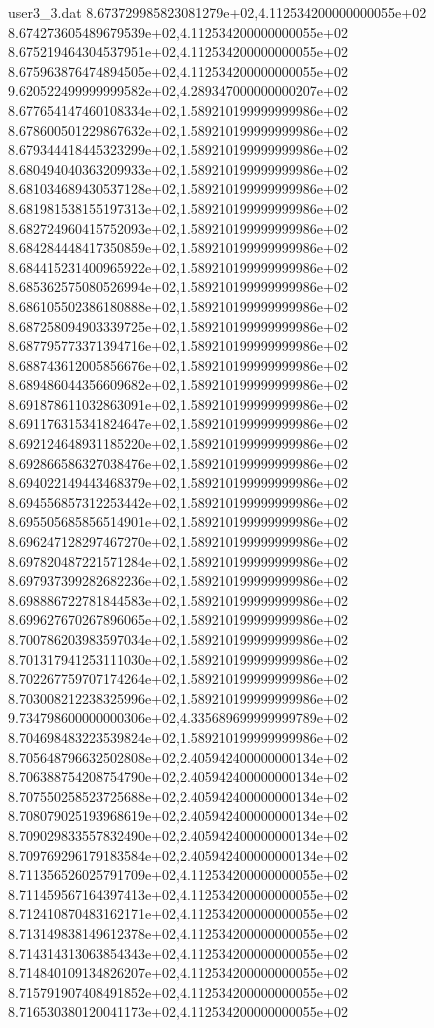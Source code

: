 \begin{filecontents}{user3_3.dat}
8.673729985823081279e+02,4.112534200000000055e+02
8.674273605489679539e+02,4.112534200000000055e+02
8.675219464304537951e+02,4.112534200000000055e+02
8.675963876474894505e+02,4.112534200000000055e+02
9.620522499999999582e+02,4.289347000000000207e+02
8.677654147460108334e+02,1.589210199999999986e+02
8.678600501229867632e+02,1.589210199999999986e+02
8.679344418445323299e+02,1.589210199999999986e+02
8.680494040363209933e+02,1.589210199999999986e+02
8.681034689430537128e+02,1.589210199999999986e+02
8.681981538155197313e+02,1.589210199999999986e+02
8.682724960415752093e+02,1.589210199999999986e+02
8.684284448417350859e+02,1.589210199999999986e+02
8.684415231400965922e+02,1.589210199999999986e+02
8.685362575080526994e+02,1.589210199999999986e+02
8.686105502386180888e+02,1.589210199999999986e+02
8.687258094903339725e+02,1.589210199999999986e+02
8.687795773371394716e+02,1.589210199999999986e+02
8.688743612005856676e+02,1.589210199999999986e+02
8.689486044356609682e+02,1.589210199999999986e+02
8.691878611032863091e+02,1.589210199999999986e+02
8.691176315341824647e+02,1.589210199999999986e+02
8.692124648931185220e+02,1.589210199999999986e+02
8.692866586327038476e+02,1.589210199999999986e+02
8.694022149443468379e+02,1.589210199999999986e+02
8.694556857312253442e+02,1.589210199999999986e+02
8.695505685856514901e+02,1.589210199999999986e+02
8.696247128297467270e+02,1.589210199999999986e+02
8.697820487221571284e+02,1.589210199999999986e+02
8.697937399282682236e+02,1.589210199999999986e+02
8.698886722781844583e+02,1.589210199999999986e+02
8.699627670267896065e+02,1.589210199999999986e+02
8.700786203983597034e+02,1.589210199999999986e+02
8.701317941253111030e+02,1.589210199999999986e+02
8.702267759707174264e+02,1.589210199999999986e+02
8.703008212238325996e+02,1.589210199999999986e+02
9.734798600000000306e+02,4.335689699999999789e+02
8.704698483223539824e+02,1.589210199999999986e+02
8.705648796632502808e+02,2.405942400000000134e+02
8.706388754208754790e+02,2.405942400000000134e+02
8.707550258523725688e+02,2.405942400000000134e+02
8.708079025193968619e+02,2.405942400000000134e+02
8.709029833557832490e+02,2.405942400000000134e+02
8.709769296179183584e+02,2.405942400000000134e+02
8.711356526025791709e+02,4.112534200000000055e+02
8.711459567164397413e+02,4.112534200000000055e+02
8.712410870483162171e+02,4.112534200000000055e+02
8.713149838149612378e+02,4.112534200000000055e+02
8.714314313063854343e+02,4.112534200000000055e+02
8.714840109134826207e+02,4.112534200000000055e+02
8.715791907408491852e+02,4.112534200000000055e+02
8.716530380120041173e+02,4.112534200000000055e+02

\end{filecontents}
